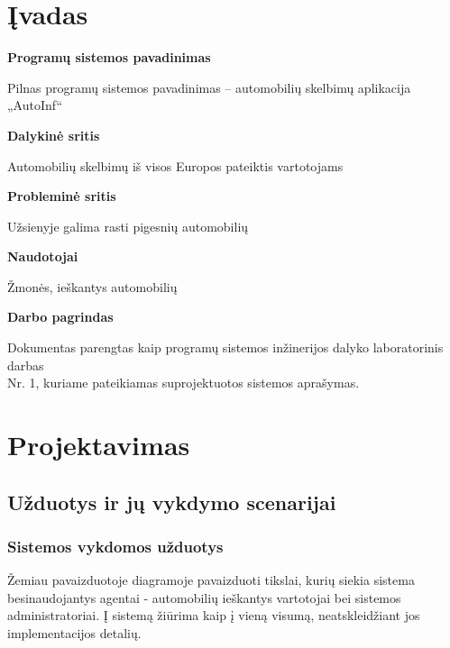 \documentclass[12pt]{article}
\begin{document}
	\tableofcontents
	\pagebreak

	\section{Įvadas}
	
	\begin{flushleft}
		\bigbreak\textbf{Programų sistemos pavadinimas}
	\end{flushleft}
	
	Pilnas programų sistemos pavadinimas – automobilių skelbimų aplikacija „AutoInf“ \\
	
	\begin{flushleft}
		\textbf{Dalykinė sritis}
	\end{flushleft}	
	
	Automobilių skelbimų iš visos Europos pateiktis vartotojams  \\
	
	\begin{flushleft}
		\textbf{Probleminė sritis}
	\end{flushleft}
	
	Užsienyje galima rasti pigesnių automobilių \\
	
	\begin{flushleft}
		\textbf{Naudotojai} 
	\end{flushleft}
	
	Žmonės, ieškantys automobilių \\
	
	\begin{flushleft}
		\textbf{Darbo pagrindas}
	\end{flushleft}
	
	Dokumentas parengtas kaip programų sistemos inžinerijos dalyko laboratorinis darbas\\Nr. 1, kuriame pateikiamas suprojektuotos sistemos aprašymas.
	\pagebreak

	\section{Projektavimas}
	\subsection{Užduotys ir jų vykdymo scenarijai}
	\subsubsection{Sistemos vykdomos užduotys}
	Žemiau pavaizduotoje diagramoje pavaizduoti tikslai, kurių siekia sistema besinaudojantys agentai - automobilių ieškantys vartotojai bei sistemos administratoriai. Į sistemą žiūrima kaip į vieną visumą, neatskleidžiant jos implementacijos detalių.
	
\end{document}
